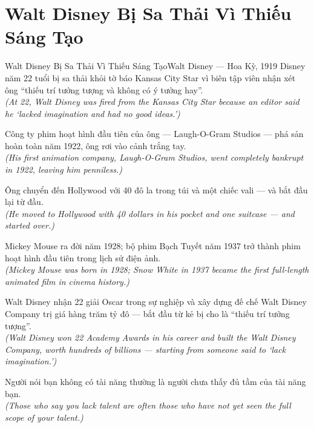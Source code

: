 \section{Walt Disney Bị Sa Thải Vì Thiếu Sáng Tạo}
\begin{truyen}{Walt Disney Bị Sa Thải Vì Thiếu Sáng Tạo}{Walt Disney --- Hoa Kỳ, 1919}
 Disney năm 22 tuổi bị sa thải khỏi tờ báo Kansas City Star vì biên tập viên nhận xét ông ``thiếu trí tưởng tượng và không có ý tưởng hay''.\\[4pt]
\textit{(At 22, Walt Disney was fired from the Kansas City Star because an editor said he `lacked imagination and had no good ideas.')}

Công ty phim hoạt hình đầu tiên của ông --- Laugh-O-Gram Studios --- phá sản hoàn toàn năm 1922, ông rơi vào cảnh trắng tay.\\[4pt]
\textit{(His first animation company, Laugh-O-Gram Studios, went completely bankrupt in 1922, leaving him penniless.)}

Ông chuyển đến Hollywood với 40 đô la trong túi và một chiếc vali --- và bắt đầu lại từ đầu.\\[4pt]
\textit{(He moved to Hollywood with 40 dollars in his pocket and one suitcase --- and started over.)}

Mickey Mouse ra đời năm 1928; bộ phim Bạch Tuyết năm 1937 trở thành phim hoạt hình đầu tiên trong lịch sử điện ảnh.\\[4pt]
\textit{(Mickey Mouse was born in 1928; Snow White in 1937 became the first full-length animated film in cinema history.)}

Walt Disney nhận 22 giải Oscar trong sự nghiệp và xây dựng đế chế Walt Disney Company trị giá hàng trăm tỷ đô --- bắt đầu từ kẻ bị cho là ``thiếu trí tưởng tượng''.\\[4pt]
\textit{(Walt Disney won 22 Academy Awards in his career and built the Walt Disney Company, worth hundreds of billions --- starting from someone said to `lack imagination.')}

\end{truyen}
\begin{baihoc}
  Người nói bạn không có tài năng thường là người chưa thấy đủ tầm của tài năng bạn.\\[4pt]
  \textit{(Those who say you lack talent are often those who have not yet seen the full scope of your talent.)}
\end{baihoc}
